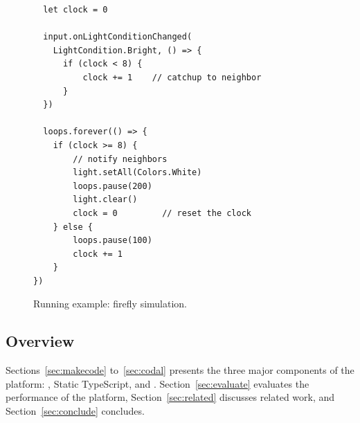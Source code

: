 \begin{figure}
\begin{lstlisting}
  let clock = 0

  input.onLightConditionChanged(
    LightCondition.Bright, () => {
      if (clock < 8) {
          clock += 1    // catchup to neighbor
      }
  })

  loops.forever(() => {
    if (clock >= 8) {
        // notify neighbors
        light.setAll(Colors.White)
        loops.pause(200)
        light.clear()
        clock = 0         // reset the clock
    } else {
        loops.pause(100)
        clock += 1
    }
})
\end{lstlisting}
\caption{\label{fig:example}Running example: firefly simulation.}
\end{figure}

\subsection{Overview}
Sections~\ref{sec:makecode} to~\ref{sec:codal} presents the three major components of the platform:
\MC, Static TypeScript, and \CO. Section~\ref{sec:evaluate} evaluates the performance of the platform,
Section~\ref{sec:related} discusses related work, and Section~\ref{sec:conclude}
concludes.